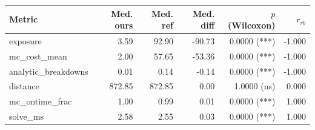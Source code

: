\begin{tabular}{lrrrrr}
\toprule
Metric & Med. ours & Med. ref & Med. diff & $p$ (Wilcoxon) & $r_{rb}$ \\
\midrule
exposure & 3.59 & 92.90 & -90.73 & 0.0000 (***) & -1.000 \\
mc_cost_mean & 2.00 & 57.65 & -53.36 & 0.0000 (***) & -1.000 \\
analytic_breakdowns & 0.01 & 0.14 & -0.14 & 0.0000 (***) & -1.000 \\
distance & 872.85 & 872.85 & 0.00 & 1.0000 (ns) & 0.000 \\
mc_ontime_frac & 1.00 & 0.99 & 0.01 & 0.0000 (***) & 1.000 \\
solve_ms & 2.58 & 2.55 & 0.03 & 0.0000 (***) & 1.000 \\
\bottomrule
\end{tabular}
